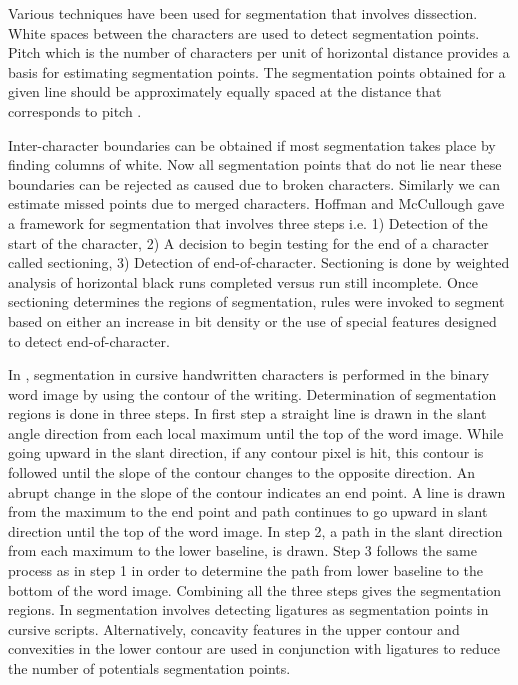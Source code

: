 Various techniques have been used for segmentation that involves
dissection. White spaces between the characters are used to detect
segmentation points. Pitch which is the number of characters per
unit of horizontal distance provides a basis for estimating
segmentation points. The segmentation points obtained for a given
line should be approximately equally spaced at the distance that
corresponds to pitch \cite{CaseyLecolinet1996}.

Inter-character boundaries can be obtained if most segmentation
takes place by finding columns of white. Now all segmentation points
that do not lie near these boundaries can be rejected as caused due
to broken characters. Similarly we can estimate missed points due to
merged characters. Hoffman and McCullough gave a framework for
segmentation that involves three steps i.e. 1) Detection of the
start of the character, 2) A decision to begin testing for the end
of a character called sectioning, 3) Detection of end-of-character.
Sectioning is done by weighted analysis of horizontal black runs
completed versus run still incomplete.  Once sectioning determines
the regions of segmentation, rules were invoked to segment based on
either an increase in bit density or the use of special features
designed to detect end-of-character.

In \cite{arica2002ocr}, segmentation in cursive handwritten
characters is performed in the binary word image by using the
contour of the writing. Determination of segmentation regions is
done in three steps. In first step a straight line is drawn in the
slant angle direction from each local maximum until the top of the
word image. While going upward in the slant direction, if any
contour pixel is hit, this contour is followed until the slope of
the contour changes to the opposite direction. An abrupt change in
the slope of the contour indicates an end point. A line is drawn
from the maximum to the end point and path continues to go upward in
slant direction until the top of the word image. In step 2, a path
in the slant direction from each maximum to the lower baseline, is
drawn. Step 3 follows the same process as in step 1 in order to
determine the path from lower baseline to the bottom of the word
image. Combining all the three steps gives the segmentation regions.
In \cite{gyeonghwan1997lda} segmentation involves detecting
ligatures as segmentation points in cursive scripts. Alternatively,
concavity features in the upper contour and convexities in the lower
contour are used in conjunction with ligatures to reduce the number
of potentials segmentation points.

